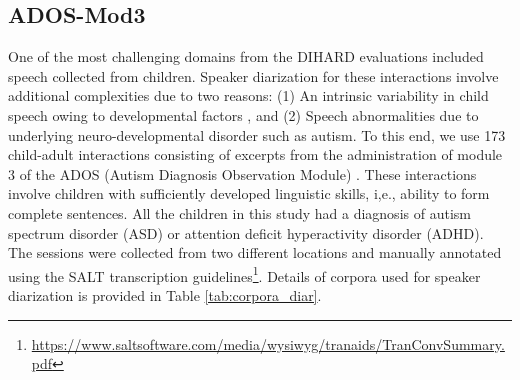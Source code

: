 \subsection{ADOS-Mod3}
\label{subsec:ados}
One of the most challenging domains from the DIHARD evaluations included speech collected from children. Speaker diarization for these interactions involve additional complexities due to two reasons: (1) An intrinsic variability in child speech owing to developmental factors \cite{Lee1999Acousticsofchildrensspeech:,lee2014developmental}, and (2) Speech abnormalities due to underlying neuro-developmental disorder such as autism. To this end, we use 173 child-adult interactions consisting of excerpts from the administration of module 3 of the ADOS (Autism Diagnosis Observation Module) \cite{Lord2000}. These interactions involve children with sufficiently developed linguistic skills, i,e., ability to form complete sentences. All the children in this study had a diagnosis of autism spectrum disorder (ASD) or attention deficit hyperactivity disorder (ADHD). The sessions were collected from two different locations and manually annotated using the SALT transcription guidelines\footnote{\url{https://www.saltsoftware.com/media/wysiwyg/tranaids/TranConvSummary.pdf}}. Details of corpora used for speaker diarization is provided in Table \ref{tab:corpora_diar}.



